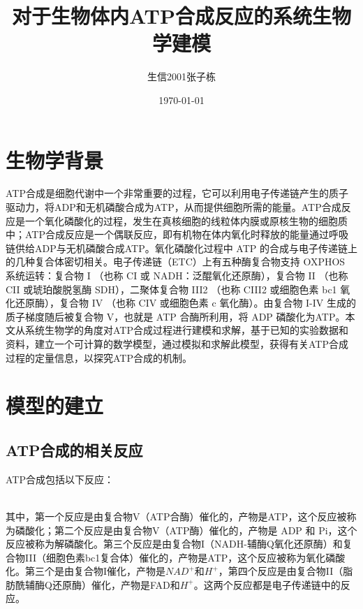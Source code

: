 \documentclass{ctexart}
\title{对于生物体内ATP合成反应的系统生物学建模}
\author{生信2001张子栋}
\date{\today}
\begin{document}
\maketitle

\newpage

\tableofcontents

\setcounter{page}{0}

\thispagestyle{empty}

\newpage

\section{生物学背景}
ATP合成是细胞代谢中一个非常重要的过程，它可以利用电子传递链产生的质子驱动力，将ADP和无机磷酸合成为ATP，从而提供细胞所需的能量。ATP合成反应是一个氧化磷酸化的过程，发生在真核细胞的线粒体内膜或原核生物的细胞质中；ATP合成反应是一个偶联反应，即有机物在体内氧化时释放的能量通过呼吸链供给ADP与无机磷酸合成ATP。氧化磷酸化过程中 ATP 的合成与电子传递链上的几种复合体密切相关。电子传递链（ETC）上有五种酶复合物支持 OXPHOS 系统运转：复合物 I （也称 CI 或 NADH：泛醌氧化还原酶），复合物 II （也称 CII 或琥珀酸脱氢酶 SDH），二聚体复合物 III2 （也称 CIII2 或细胞色素 bc1 氧化还原酶），复合物 IV （也称 CIV 或细胞色素 c 氧化酶）。由复合物 I-IV 生成的质子梯度随后被复合物 V，也就是 ATP 合酶所利用，将 ADP 磷酸化为ATP。本文从系统生物学的角度对ATP合成过程进行建模和求解，基于已知的实验数据和资料，建立一个可计算的数学模型，通过模拟和求解此模型，获得有关ATP合成过程的定量信息，以探究ATP合成的机制。

\section{模型的建立}
\subsection{ATP合成的相关反应}
ATP合成包括以下反应：
\quad\\





\quad\\

其中，第一个反应是由复合物V（ATP合酶）催化的，产物是ATP，这个反应被称为磷酸化；第二个反应是由复合物V（ATP酶）催化的，产物是 ADP 和 Pi，这个反应被称为解磷酸化。第三个反应是由复合物I（NADH-辅酶Q氧化还原酶）和复合物III（细胞色素bc1复合体）催化的，产物是ATP，这个反应被称为氧化磷酸化。第三个是由复合物I催化，产物是$NAD^+$和$H^+$，第四个反应是由复合物II（脂肪酰辅酶Q还原酶）催化，产物是FAD和$H^+$。这两个反应都是电子传递链中的反应。
\end{document}
